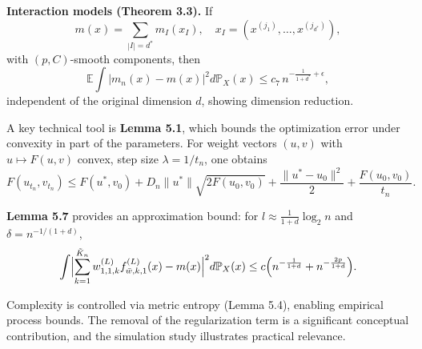 \documentclass[11pt]{article}
\begin{document}
\medskip
\noindent \textbf{Interaction models (Theorem 3.3).} 
If
$$
m(x)=\sum_{|I|=d^*} m_I(x_I),\quad x_I=(x^{(j_1)},\dots,x^{(j_{d^*})}),
$$
with $(p,C)$-smooth components, then
$$
\mathbb{E}\int |m_n(x)-m(x)|^2 d\mathbb{P}_X(x)\le c_7\, n^{-\frac{1}{1+d^*}+\epsilon},
$$
independent of the original dimension $d$, showing dimension reduction.

\medskip
\noindent A key technical tool is \textbf{Lemma 5.1}, which bounds the optimization error under convexity in part of the parameters. For weight vectors $(u,v)$ with $u\mapsto F(u,v)$ convex, step size $\lambda=1/t_n$, one obtains
$$
F(u_{t_n},v_{t_n})\le F(u^*,v_0)+D_n\|u^*\|\sqrt{2F(u_0,v_0)}+\frac{\|u^*-u_0\|^2}{2}+\frac{F(u_0,v_0)}{t_n}.
$$

\noindent \textbf{Lemma 5.7} provides an approximation bound: for $l\approx \frac{1}{1+d}\log_2 n$ and $\delta=n^{-1/(1+d)}$,
$$
\int \Bigl|\sum_{k=1}^{\tilde K_n} w_{1,1,k}^{(L)} f_{\bar w,k,1}^{(L)}(x)-m(x)\Bigr|^2 d\mathbb{P}_X(x)\le c\Bigl(n^{-\frac{1}{1+d}}+n^{-\frac{2p}{1+d}}\Bigr).
$$

Complexity is controlled via metric entropy (Lemma 5.4), enabling empirical process bounds. The removal of the regularization term is a significant conceptual contribution, and the simulation study illustrates practical relevance. 
\end{document}
